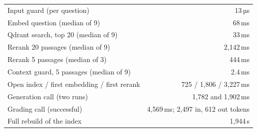 \begin{center}\small
\begin{tabular}{@{}lr@{}}
\toprule
Input guard (per question) & 13\,µs\\
Embed question (median of 9) & 68\,ms\\
Qdrant search, top 20 (median of 9) & 33\,ms\\
Rerank 20 passages (median of 9) & 2,142\,ms\\
Rerank 5 passages (median of 3) & 444\,ms\\
Context guard, 5 passages (median of 9) & 2.4\,ms\\
Open index / first embedding / first rerank & 725 / 1,806 / 3,227\,ms\\
Generation call (two runs) & 1,782 and 1,902\,ms\\
Grading call (successful) & 4,569\,ms; 2,497 in, 612 out tokens\\
Full rebuild of the index & 1,944\,s\\
\bottomrule
\end{tabular}
\end{center}
